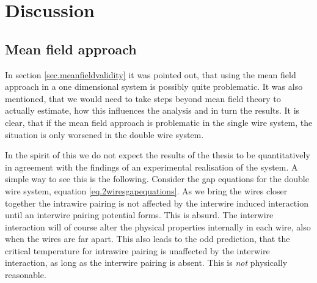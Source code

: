\chapter{Discussion} %

\label{Chapter12} %

\section{Mean field approach} \label{sec.Discussion.meanfieldapproach}
In section \ref{sec.meanfieldvalidity} it was pointed out, that using the mean field approach in a one dimensional system is possibly quite problematic. It was also mentioned, that we would need to take steps beyond mean field theory to actually estimate, how this influences the analysis and in turn the results. It is clear, that if the mean field approach is problematic in the single wire system, the situation is only worsened in the double wire system. 

In the spirit of this we do not expect the results of the thesis to be quantitatively in agreement with the findings of an experimental realisation of the system. A simple way to see this is the following. Consider the gap equations for the double wire system, equation \eqref{eq.2wiresgapequations}. As we bring the wires closer together the intrawire pairing is not affected by the interwire induced interaction until an interwire pairing potential forms. This is absurd. The interwire interaction will of course alter the physical properties internally in each wire, also when the wires are far apart. This also leads to the odd prediction, that the critical temperature for intrawire pairing is unaffected by the interwire interaction, as long as the interwire pairing is absent. This is \textit{not} physically reasonable. 

